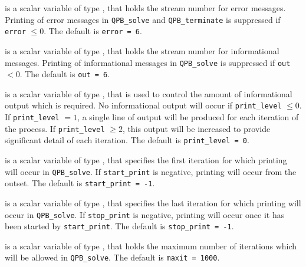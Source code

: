\begin{description}

 is a scalar variable of type \integer, that holds the
stream number for error messages. Printing of error messages in 
{\tt QPB\_solve} and {\tt QPB\_terminate} 
is suppressed if {\tt error} $\leq 0$.
The default is {\tt error = 6}.

 is a scalar variable of type \integer, that holds the
stream number for informational messages. Printing of informational messages in 
{\tt QPB\_solve} is suppressed if {\tt out} $< 0$.
The default is {\tt out = 6}.

 is a scalar variable of type \integer, that is used
to control the amount of informational output which is required. No 
informational output will occur if {\tt print\_level} $\leq 0$. If 
{\tt print\_level} $= 1$, a single line of output will be produced for each
iteration of the process. If {\tt print\_level} $\geq 2$, this output will be
increased to provide significant detail of each iteration.
The default is {\tt print\_level = 0}.

 is a scalar variable of type \integer, that specifies
the first iteration for which printing will occur in {\tt QPB\_solve}.
If {\tt start\_print} is negative, printing will occur from the outset.
The default is {\tt start\_print = -1}.

 is a scalar variable of type \integer, that specifies
the last iteration for which printing will occur in  {\tt QPB\_solve}.
If {\tt stop\_print} is negative, printing will occur once it has been 
started by {\tt start\_print}.
The default is {\tt stop\_print = -1}.

 is a scalar variable of type \integer, that holds the
maximum number of iterations which will be allowed in {\tt QPB\_solve}.
The default is {\tt maxit = 1000}.




\end{description}
